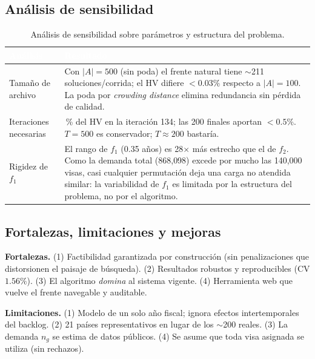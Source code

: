 \documentclass[11pt,letterpaper]{article}
\begin{document}
\subsection{Análisis de sensibilidad}
\begin{table}[H]
\centering
\renewcommand{\arraystretch}{1.25}
\small
\begin{tabular}{l>{\raggedright\arraybackslash}p{11cm}}
\toprule
\rowcolor{tablehead}
\textcolor{white}{\textbf{Análisis}} & \textcolor{white}{\textbf{Resultado}}\\
\midrule
Tamaño de archivo & Con $|A|=500$ (sin poda) el frente natural tiene $\sim$211 soluciones/corrida; el HV difiere $<0.03\%$ respecto a $|A|=100$. La poda por \textit{crowding distance} elimina redundancia sin pérdida de calidad.\\
\rowcolor{gray!8}
Iteraciones necesarias & 99\,\% del HV en la iteración 134; las 200 finales aportan $<0.5\%$. $T=500$ es conservador; $T\approx200$ bastaría.\\
Rigidez de $f_1$ & El rango de $f_1$ (0.35 años) es 28$\times$ más estrecho que el de $f_2$. Como la demanda total (868{,}098) excede por mucho las 140{,}000 visas, casi cualquier permutación deja una carga no atendida similar: la variabilidad de $f_1$ es limitada por la estructura del problema, no por el algoritmo.\\
\bottomrule
\end{tabular}
\caption{Análisis de sensibilidad sobre parámetros y estructura del problema.}
\end{table}

\subsection{Fortalezas, limitaciones y mejoras}
\begin{resultbox}
\textbf{Fortalezas.} (1) Factibilidad garantizada por construcción (sin penalizaciones que distorsionen el paisaje de búsqueda). (2) Resultados robustos y reproducibles (CV $1.56\%$). (3) El algoritmo \emph{domina} al sistema vigente. (4) Herramienta web que vuelve el frente navegable y auditable.
\end{resultbox}

\begin{restrictionbox}
\textbf{Limitaciones.} (1) Modelo de un solo año fiscal; ignora efectos intertemporales del backlog. (2) 21 países representativos en lugar de los $\sim$200 reales. (3) La demanda $n_g$ se estima de datos públicos. (4) Se asume que toda visa asignada se utiliza (sin rechazos).
\end{restrictionbox}
\end{document}
